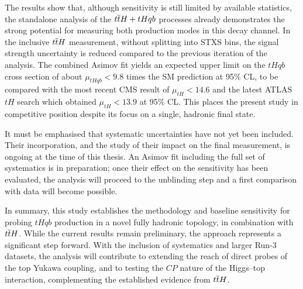 The results show that, although sensitivity is still limited by available statistics, the standalone analysis of the \(t\overline{t}H+tHqb\) processes already demonstrates the strong potential for measuring both production modes in this decay channel.  
 In the inclusive \(t\overline{t}H\) measurement, without splitting into STXS bins, the signal strength uncertainty is reduced compared to the previous iteration of the analysis. The combined Asimov fit yields an expected upper limit on the \(tHqb\) cross section of about \(\mu_{tHqb} < 9.8\) times the SM prediction at 95\% CL, to be compared with the most recent CMS result of \(\mu_{tH} < 14.6\) and the latest ATLAS $tH$ search which obtained \(\mu_{tH} < 13.9\) at 95\% CL. This places the present study in competitive position despite its focus on a single, hadronic final state.  

It must be emphasised that systematic uncertainties have not yet been included. Their incorporation, and the study of their impact on the final measurement, is ongoing at the time of this thesis. An Asimov fit including the full set of systematics is in preparation; once their effect on the sensitivity has been evaluated, the analysis will proceed to the unblinding step and a first comparison with data will become possible.  

In summary, this study establishes the methodology and baseline sensitivity for probing \(tHqb\) production in a novel fully hadronic \htautau topology, in combination with \(t\overline{t}H\). While the current results remain preliminary, the approach represents a significant step forward. With the inclusion of systematics and larger Run-3 datasets, the analysis will contribute to extending the reach of direct probes of the top Yukawa coupling, and to testing the $CP$ nature of the Higgs–top interaction, complementing the established evidence from \(t\overline{t}H\).  
